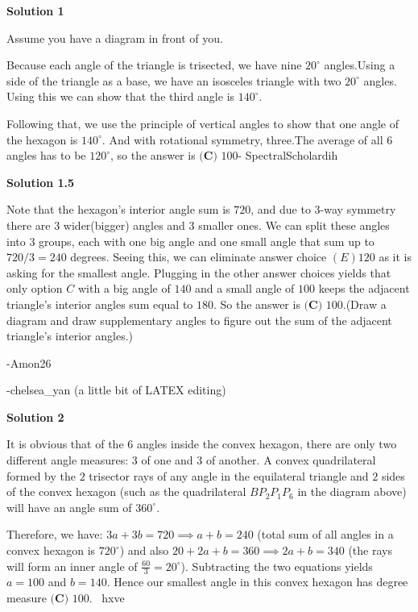 \begin{enumerate}
\textbf{Solution 1}

Assume you have a diagram in front of you.

 Because each angle of the triangle is trisected, we have nine $20^\circ$ angles.Using a side of the triangle as a base, we have an isosceles triangle with two $20^\circ$ angles. Using this we can show that the third angle is $140^\circ$. 

 Following that, we use the principle of vertical angles to show that one angle of the hexagon is $140^\circ$. And with rotational symmetry, three.The average of all $6$ angles has to be $120^\circ$, so the answer is $\boxed{\textbf{(C) }100}$- SpectralScholardih

 



\textbf{Solution 1.5}

Note that the hexagon’s interior angle sum is $720$, and due to $3$-way symmetry there are $3$ wider(bigger) angles and $3$ smaller ones. We can split these angles into $3$ groups, each with one big angle and one small angle that sum up to $720/3 = 240$ degrees. Seeing this, we can eliminate answer choice $(E)120$ as it is asking for the smallest angle. Plugging in the other answer choices yields that only option $C$ with a big angle of $140$ and a small angle of $100$ keeps the adjacent triangle’s interior angles sum equal to $180$. So the answer is $\boxed{\textbf{(C) }100}$.(Draw a diagram and draw supplementary angles to figure out the sum of the adjacent triangle’s interior angles.)

 -Amon26

 -chelsea\_yan (a little bit of LATEX editing)

 



\textbf{Solution 2}

It is obvious that of the $6$ angles inside the convex hexagon, there are only two different angle measures: $3$ of one and $3$ of another. A convex quadrilateral formed by the $2$ trisector rays of any angle in the equilateral triangle and $2$ sides of the convex hexagon (such as the quadrilateral $BP_2P_1P_6$ in the diagram above) will have an angle sum of $360^{\circ}$.

 Therefore, we have: $3a+3b=720 \implies a+b=240$ (total sum of all angles in a convex hexagon is $720^{\circ}$) and also $20+2a+b=360 \implies 2a+b=340$ (the rays will form an inner angle of $\frac{60}{3}=20^{\circ}$). Subtracting the two equations yields $a=100$ and $b=140$. Hence our smallest angle in this convex hexagon has degree measure $\boxed{\textbf{(C) }100}$. ~hxve


\end{enumerate}
